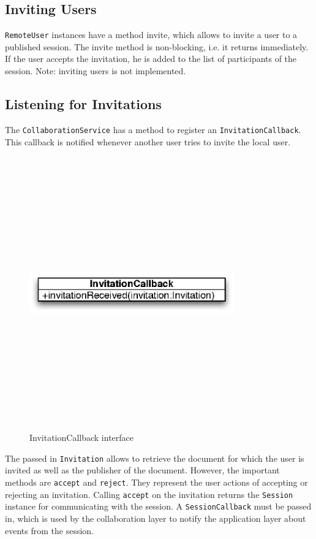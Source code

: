 \subsection{Inviting Users}
\texttt{RemoteUser} instances have a method invite, which allows to invite
a user to a published session. The invite method is non-blocking, i.e. it
returns immediately. If the user accepts the invitation, he is added to the
list of participants of the session. Note: inviting users is not implemented.

\subsection{Listening for Invitations}
The \texttt{CollaborationService} has a method to register an
\texttt{InvitationCallback}. This callback is notified whenever another user
tries to invite the local user. 

\begin{figure}[H]
 \centering
 \includegraphics[width=8.85cm,height=11.76cm]{../images/design/collaboration-invitationcallback.eps}
 \caption{InvitationCallback interface}
\end{figure}

The passed in \texttt{Invitation} allows to retrieve the document for which
the user is invited as well as the publisher of the document. However,
the important methods are \texttt{accept} and \texttt{reject}. They represent
the user actions of accepting or rejecting an invitation. Calling 
\texttt{accept} on the invitation returns the \texttt{Session} instance
for communicating with the session. A \texttt{SessionCallback} must be passed
in, which is used by the collaboration layer to notify the application
layer about events from the session.

